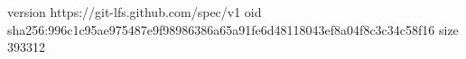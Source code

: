version https://git-lfs.github.com/spec/v1
oid sha256:996c1c95ae975487e9f98986386a65a91fe6d48118043ef8a04f8c3c34c58f16
size 393312
